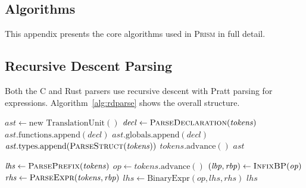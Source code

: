 \documentclass[11pt,a4paper]{article}
\begin{document}
\clearpage
\begin{appendices}

\section{Algorithms}\label{app:algorithms}

This appendix presents the core algorithms used in \textsc{Prism} in
full detail.

\subsection{Recursive Descent Parsing}\label{app:parsing}

Both the C and Rust parsers use recursive descent with Pratt parsing
for expressions. Algorithm~\ref{alg:rdparse} shows the overall structure.

\begin{algorithm}[h]
\caption{Recursive Descent Parser}\label{alg:rdparse}
\begin{algorithmic}[1]
  \State $\mathit{ast} \gets \text{new TranslationUnit}()$
      \State $\mathit{decl} \gets \Call{ParseDeclaration}{\mathit{tokens}}$
        \State $\mathit{ast}.\text{functions}.\text{append}(\mathit{decl})$
      \Else
        \State $\mathit{ast}.\text{globals}.\text{append}(\mathit{decl})$
      \EndIf
      \State $\mathit{ast}.\text{types}.\text{append}(\Call{ParseStruct}{\mathit{tokens}})$
    \Else
      \State {}
      \State $\mathit{tokens}.\text{advance}()$
    \EndIf
  \EndWhile
  \State \Return $\mathit{ast}$
\EndProcedure
\end{algorithmic}
\end{algorithm}

\begin{algorithm}[h]
\caption{Pratt Expression Parser}\label{alg:pratt}
\begin{algorithmic}[1]
  \State $\mathit{lhs} \gets \Call{ParsePrefix}{\mathit{tokens}}$
    \State $\mathit{op} \gets \mathit{tokens}.\text{advance}()$
    \State $(\mathit{lbp}, \mathit{rbp}) \gets \Call{InfixBP}{\mathit{op}}$
    \State $\mathit{rhs} \gets \Call{ParseExpr}{\mathit{tokens}, \mathit{rbp}}$
    \State $\mathit{lhs} \gets \text{BinaryExpr}(\mathit{op}, \mathit{lhs}, \mathit{rhs})$
  \EndWhile
  \State \Return $\mathit{lhs}$
\EndProcedure
\end{algorithmic}
\end{algorithm}


\end{appendices}
\end{document}

